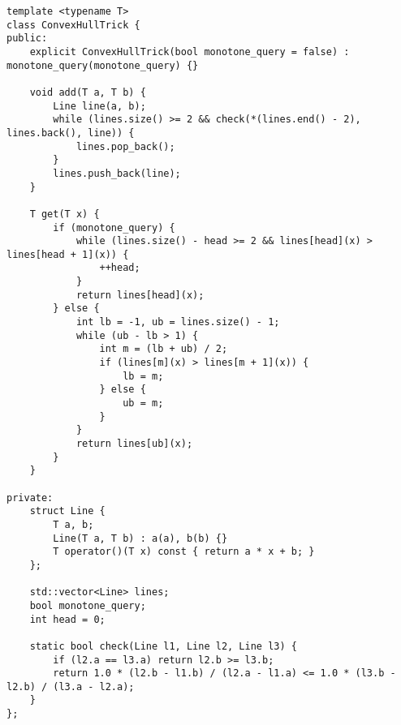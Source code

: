 \begin{lstlisting}
template <typename T>
class ConvexHullTrick {
public:
    explicit ConvexHullTrick(bool monotone_query = false) : monotone_query(monotone_query) {}

    void add(T a, T b) {
        Line line(a, b);
        while (lines.size() >= 2 && check(*(lines.end() - 2), lines.back(), line)) {
            lines.pop_back();
        }
        lines.push_back(line);
    }

    T get(T x) {
        if (monotone_query) {
            while (lines.size() - head >= 2 && lines[head](x) > lines[head + 1](x)) {
                ++head;
            }
            return lines[head](x);
        } else {
            int lb = -1, ub = lines.size() - 1;
            while (ub - lb > 1) {
                int m = (lb + ub) / 2;
                if (lines[m](x) > lines[m + 1](x)) {
                    lb = m;
                } else {
                    ub = m;
                }
            }
            return lines[ub](x);
        }
    }

private:
    struct Line {
        T a, b;
        Line(T a, T b) : a(a), b(b) {}
        T operator()(T x) const { return a * x + b; }
    };

    std::vector<Line> lines;
    bool monotone_query;
    int head = 0;

    static bool check(Line l1, Line l2, Line l3) {
        if (l2.a == l3.a) return l2.b >= l3.b;
        return 1.0 * (l2.b - l1.b) / (l2.a - l1.a) <= 1.0 * (l3.b - l2.b) / (l3.a - l2.a);
    }
};
\end{lstlisting}